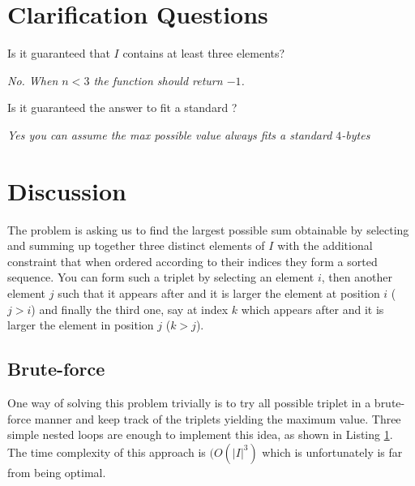\section{Clarification Questions}

\begin{QandA}
	\item  Is it guaranteed that $I$ contains at least three elements?
	\begin{answered}
		\textit{No. When $n < 3$ the function should return $-1$.}
	\end{answered}
	\item  Is it guaranteed the answer to fit a standard ?
	\begin{answered}
		\textit{Yes you can assume the max possible value always fits a standard $4$-bytes }
	\end{answered}
\end{QandA}

\section{Discussion}
\label{max_triplet:sec:discussion}
The problem is asking us to find the largest possible sum obtainable by selecting and summing up together
three distinct elements of $I$ with the additional constraint that when ordered according to their indices 
they form a sorted sequence. 
You can form such a triplet by selecting an element $i$,
then another element $j$ such that it appears after and it is larger the element at position $i$ ($j>i$)  and finally the third one, say at index $k$
which appears after and it is larger the element in position $j$ ($k>j$).

\subsection{Brute-force}
\label{max_triplet:sec:bruteforce}
One way of solving this problem trivially is to try all possible triplet in a brute-force manner and keep track of the triplets yielding the maximum value.
Three simple nested loops are enough to implement this idea, as shown in Listing \ref{}. The time complexity of this approach is $(O(|I|^3)$ which is unfortunately is far from being optimal.

\begin{minipage}{\linewidth}
	
\end{minipage}

